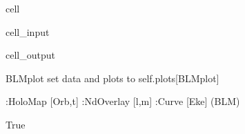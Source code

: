 \documentclass[letterpaper,table,10pt,english]{jupyterBook}
\begin{document}
\begin{sphinxuseclass}{cell}\begin{sphinxVerbatimInput}

\begin{sphinxuseclass}{cell_input}
\begin{sphinxVerbatim}[commandchars=\\\{\}]
 
\end{sphinxVerbatim}

\end{sphinxuseclass}\end{sphinxVerbatimInput}
\begin{sphinxVerbatimOutput}

\begin{sphinxuseclass}{cell_output}
\begin{sphinxVerbatim}[commandchars=\\\{\}]
BLMplot set data and plots to self.plots[\PYGZsq{}BLMplot\PYGZsq{}]
\end{sphinxVerbatim}

\begin{sphinxVerbatim}[commandchars=\\\{\}]
:HoloMap   [Orb,t]
   :NdOverlay   [l,m]
      :Curve   [Eke]   (BLM)
\end{sphinxVerbatim}

\begin{sphinxVerbatim}[commandchars=\\\{\}]
True
\end{sphinxVerbatim}

\end{sphinxuseclass}\end{sphinxVerbatimOutput}

\end{sphinxuseclass}
\end{document}
